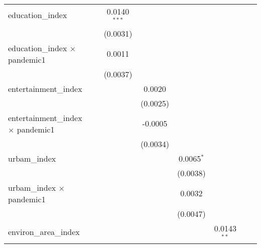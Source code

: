 \begin{table}[htbp]
\begin{tabular}{lccccccc}
      education\_index                           &                & 0.0140$^{***}$ &                &                &                &                &   \\   
                                                 &                & (0.0031)       &                &                &                &                &   \\   
      education\_index $\times$ pandemic1        &                & 0.0011         &                &                &                &                &   \\   
                                                 &                & (0.0037)       &                &                &                &                &   \\   
      entertainment\_index                       &                &                & 0.0020         &                &                &                &   \\   
                                                 &                &                & (0.0025)       &                &                &                &   \\   
      entertainment\_index $\times$ pandemic1    &                &                & -0.0005        &                &                &                &   \\   
                                                 &                &                & (0.0034)       &                &                &                &   \\   
      urbam\_index                               &                &                &                & 0.0065$^{*}$   &                &                &   \\   
                                                 &                &                &                & (0.0038)       &                &                &   \\   
      urbam\_index $\times$ pandemic1            &                &                &                & 0.0032         &                &                &   \\   
                                                 &                &                &                & (0.0047)       &                &                &   \\   
      environ\_area\_index                       &                &                &                &                & 0.0143$^{**}$  &                &   \\   

\end{tabular}
\end{table}
